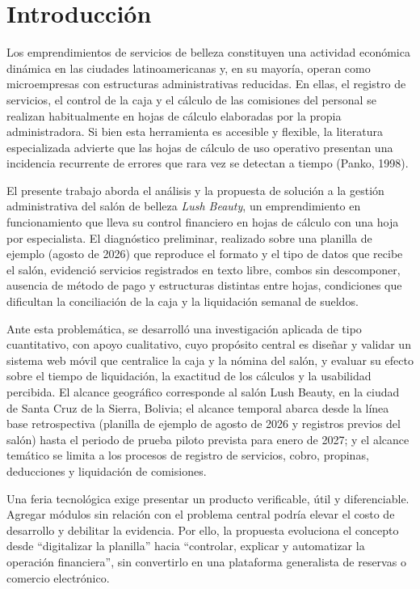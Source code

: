 \section{Introducción}\label{cap:introduccion}

Los emprendimientos de servicios de belleza constituyen una actividad económica dinámica en las ciudades latinoamericanas y, en su mayoría, operan como microempresas con estructuras administrativas reducidas. En ellas, el registro de servicios, el control de la caja y el cálculo de las comisiones del personal se realizan habitualmente en hojas de cálculo elaboradas por la propia administradora. Si bien esta herramienta es accesible y flexible, la literatura especializada advierte que las hojas de cálculo de uso operativo presentan una incidencia recurrente de errores que rara vez se detectan a tiempo (Panko, 1998).


El presente trabajo aborda el análisis y la propuesta de solución a la gestión administrativa del salón de belleza \textit{Lush Beauty}, un emprendimiento en funcionamiento que lleva su control financiero en hojas de cálculo con una hoja por especialista. El diagnóstico preliminar, realizado sobre una planilla de ejemplo (agosto de 2026) que reproduce el formato y el tipo de datos que recibe el salón, evidenció servicios registrados en texto libre, combos sin descomponer, ausencia de método de pago y estructuras distintas entre hojas, condiciones que dificultan la conciliación de la caja y la liquidación semanal de sueldos.


Ante esta problemática, se desarrolló una investigación aplicada de tipo cuantitativo, con apoyo cualitativo, cuyo propósito central es diseñar y validar un sistema web móvil que centralice la caja y la nómina del salón, y evaluar su efecto sobre el tiempo de liquidación, la exactitud de los cálculos y la usabilidad percibida. El alcance geográfico corresponde al salón Lush Beauty, en la ciudad de Santa Cruz de la Sierra, Bolivia; el alcance temporal abarca desde la línea base retrospectiva (planilla de ejemplo de agosto de 2026 y registros previos del salón) hasta el periodo de prueba piloto prevista para enero de 2027; y el alcance temático se limita a los procesos de registro de servicios, cobro, propinas, deducciones y liquidación de comisiones.


Una feria tecnológica exige presentar un producto verificable, útil y diferenciable. Agregar módulos sin relación con el problema central podría elevar el costo de desarrollo y debilitar la evidencia. Por ello, la propuesta evoluciona el concepto desde “digitalizar la planilla” hacia “controlar, explicar y automatizar la operación financiera”, sin convertirlo en una plataforma generalista de reservas o comercio electrónico.


